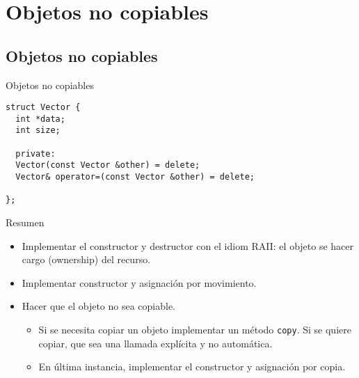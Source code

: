 \section{Objetos no copiables}
\subsection*{Objetos no copiables}
\begin{frame}[fragile]{ Objetos no copiables}{}
        \begin{lstlisting}[style=normal,firstnumber=1]
struct Vector {
  int *data;
  int size;

  private:
  Vector(const Vector &other) = delete;
  Vector& operator=(const Vector &other) = delete;

};
        \end{lstlisting}
\end{frame}

\begin{frame}[fragile]{Resumen}
   \begin{itemize}
       \item Implementar el constructor y destructor con el idiom RAII: el objeto se hacer cargo (ownership) del recurso.
       \item Implementar constructor y asignaci\'on por movimiento.
       \item Hacer que el objeto no sea copiable.
       \begin{itemize}
            \item Si se necesita copiar un objeto implementar un m\'etodo \lstinline[style=normal]!copy!. Si se quiere copiar, que sea una llamada expl\'icita y no autom\'atica.
            \item En \'ultima instancia, implementar el constructor y asignaci\'on por copia.
       \end{itemize}
   \end{itemize}
\end{frame}

